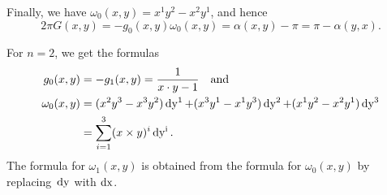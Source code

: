 \documentclass[\MainFolder/Text.tex]{subfiles}
\begin{document}
\begin{Example}
\begin{ExampleList}
Finally, we have $\omega_{0}(x,y) = x^1 y^2 - x^2 y^1$, and hence
$$ 2\pi G(x,y) =  - g_{0}(x,y) \omega_{0}(x,y) = \alpha(x,y) - \pi = \pi - \alpha(y,x). $$
\item For $n=2$, we get the formulas
\allowdisplaybreaks
\begin{align*}
g_0(x,y) & = - g_1(x,y) = \frac{1}{x\cdot y - 1}\quad\text{and} \\
\omega_0(x,y) &=(x^2 y^3 - x^3 y^2) \operatorname{dy^1} +(x^3 y^1 - x^1 y^3) \operatorname{dy^2} + (x^1 y^2 - x^2 y^1) \operatorname{dy^3} \\ &=\sum_{i=1}^3 (x\times y)^i \operatorname{dy^i}.
\end{align*}
The formula for $\omega_1(x,y)$ is obtained from the formula for $\omega_0(x,y)$ by replacing~$\operatorname{dy}$ with $\operatorname{dx}$.\qedhere
\end{ExampleList}
\end{Example}
\end{document}
